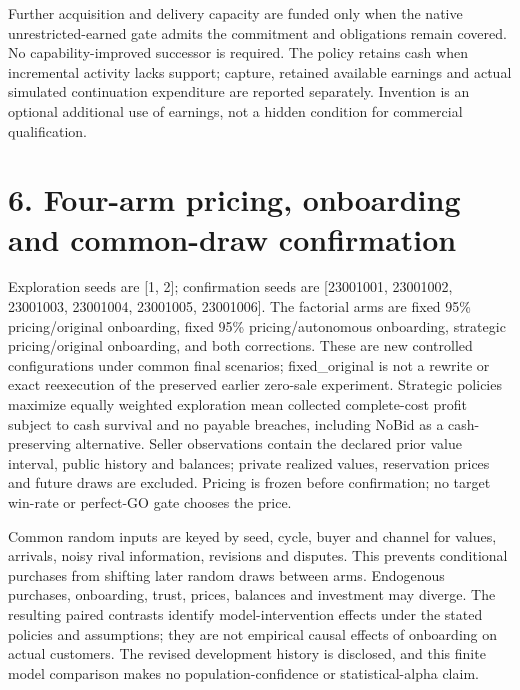\documentclass[10pt,letterpaper]{article}
\begin{document}
Further acquisition and delivery capacity are funded only when the native unrestricted-earned gate admits the commitment and obligations remain covered. No capability-improved successor is required. The policy retains cash when incremental activity lacks support; capture, retained available earnings and actual simulated continuation expenditure are reported separately. Invention is an optional additional use of earnings, not a hidden condition for commercial qualification.

\section*{6. Four-arm pricing, onboarding and common-draw confirmation}
Exploration seeds are [1, 2]; confirmation seeds are [23001001, 23001002, 23001003, 23001004, 23001005, 23001006]. The factorial arms are fixed 95\% pricing/original onboarding, fixed 95\% pricing/autonomous onboarding, strategic pricing/original onboarding, and both corrections. These are new controlled configurations under common final scenarios; fixed\_\allowbreak{}original is not a rewrite or exact reexecution of the preserved earlier zero-sale experiment. Strategic policies maximize equally weighted exploration mean collected complete-cost profit subject to cash survival and no payable breaches, including NoBid as a cash-preserving alternative. Seller observations contain the declared prior value interval, public history and balances; private realized values, reservation prices and future draws are excluded. Pricing is frozen before confirmation; no target win-rate or perfect-GO gate chooses the price.

Common random inputs are keyed by seed, cycle, buyer and channel for values, arrivals, noisy rival information, revisions and disputes. This prevents conditional purchases from shifting later random draws between arms. Endogenous purchases, onboarding, trust, prices, balances and investment may diverge. The resulting paired contrasts identify model-intervention effects under the stated policies and assumptions; they are not empirical causal effects of onboarding on actual customers. The revised development history is disclosed, and this finite model comparison makes no population-confidence or statistical-alpha claim.
\end{document}
